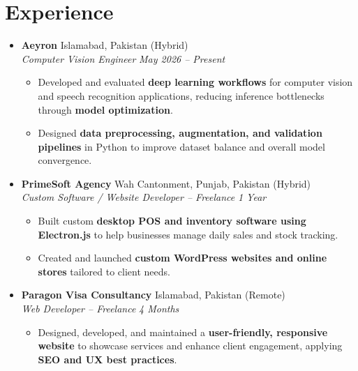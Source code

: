 \documentclass[10pt,letterpaper]{article}
\begin{document}
\section{Experience}
\begin{itemize}
    \item \textbf{Aeyron} \hfill Islamabad, Pakistan (Hybrid) \\
    \textit{Computer Vision Engineer} \hfill \textit{May 2026 -- Present}
    \begin{itemize}
        \item Developed and evaluated \textbf{deep learning workflows} for computer vision and speech recognition applications, reducing inference bottlenecks through \textbf{model optimization}.
        \item Designed \textbf{data preprocessing, augmentation, and validation pipelines} in Python to improve dataset balance and overall model convergence.
    \end{itemize}
    
    \vspace{4pt}
    \item \textbf{PrimeSoft Agency} \hfill Wah Cantonment, Punjab, Pakistan (Hybrid) \\
    \textit{Custom Software / Website Developer -- Freelance} \hfill \textit{1 Year}
    \begin{itemize}
        \item Built custom \textbf{desktop POS and inventory software using Electron.js} to help businesses manage daily sales and stock tracking.
        \item Created and launched \textbf{custom WordPress websites and online stores} tailored to client needs.
    \end{itemize}
    
    \vspace{4pt}
    \item \textbf{Paragon Visa Consultancy} \hfill Islamabad, Pakistan (Remote) \\
    \textit{Web Developer -- Freelance} \hfill \textit{4 Months}
    \begin{itemize}
        \item Designed, developed, and maintained a \textbf{user-friendly, responsive website} to showcase services and enhance client engagement, applying \textbf{SEO and UX best practices}.
    \end{itemize}
\end{itemize}

\end{document}
